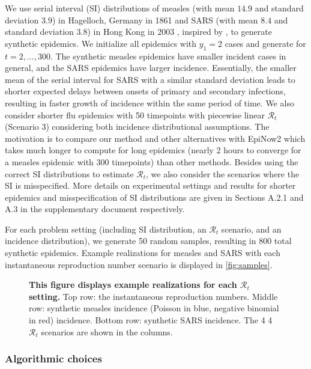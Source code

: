 \documentclass[10pt,letterpaper]{article}
\def\calR{\mathcal{R}}
\begin{document}
We use serial interval (SI) distributions of measles (with mean $14.9$ and
standard deviation $3.9$) in Hagelloch, Germany in 1861
\cite{groendyke2011bayesian} and SARS (with mean $8.4$ and standard deviation
$3.8$) in Hong Kong in 2003 \cite{lipsitch2003transmission}, inspired by
\cite{cori2013new}, to generate synthetic epidemics. We initialize all epidemics
with $y_1=2$ cases and generate for $t=2,\ldots,300$. The synthetic measles
epidemics have smaller incident cases in general, and the SARS epidemics have
larger incidence. Essentially, the smaller mean of the serial interval for SARS
with a similar standard deviation leads to shorter expected delays between
onsets of primary and secondary infections, resulting in faster growth of
incidence within the same period of time. We also consider shorter flu epidemics
with 50 timepoints with piecewise linear $\calR_t$ (Scenario 3) considering both
incidence distributional assumptions. The motivation is to compare our method
and other alternatives with EpiNow2 which takes much longer to compute for long
epidemics (nearly 2 hours to converge for a measles epidemic with 300
timepoints) than other methods. Besides using the correct SI distributions to
estimate $\calR_t$, we also consider the scenarios where the SI is misspecified.
More details on experimental settings and results for shorter epidemics and
misspecification of SI distributions are given in Sections A.2.1 and A.3 in the
supplementary document respectively. 

For each problem setting (including SI distribution, an $\calR_t$ scenario, and
an incidence distribution), we generate 50 random samples, resulting in $800$
total synthetic epidemics. Example realizations for measles and SARS with each
instantaneous reproduction number scenario is displayed in
\autoref{fig:samples}. 

\begin{figure}[!t]
  \centering
  \caption{{\bf This figure displays example realizations for each $\calR_t$ setting.}
  Top row: the instantaneous reproduction numbers. Middle row: synthetic measles
  incidence (Poisson in blue, negative binomial in red) incidence. Bottom row:
  synthetic SARS incidence. The 4 4 $\calR_t$ scenarios are shown in the
  columns.} 
  \label{fig:samples}
\end{figure}

\subsubsection{Algorithmic choices}
\end{document}
